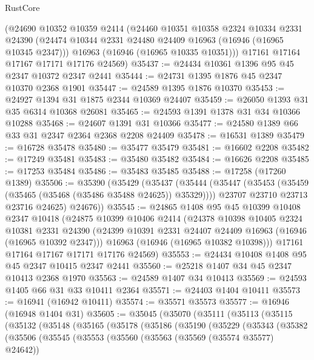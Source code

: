 \begin{lexlean}{RustCore}
\begin{coremodule}
    (@24690
      @10352
      @10359
      @2414
      (@24460
        @10351
        @10358
        @2324
        @10334
        @2331
        @24390
        (@24474 @10344 @2331 @24480 @24409 @16963 (@16946 (@16965 @10345 @2347)))
        @16963
        (@16946 (@16965 @10335 @10351)))
      @17161
      @17164
      @17167
      @17171
      @17176
      @24569)
@35437 := @24434 @10361 @1396 @95 @45 @2347 @10372 @2347 @2441
@35444 := @24731 @1395 @1876 @45 @2347 @10370 @2368 @1901
@35447 := @24589 @1395 @1876 @10370
@35453 := @24927 @1394 @31 @1875 @2344 @10369 @24407
@35459 := @26050 @1393 @31 @35 @6314 @10368 @26081
@35465 := @24593 @1391 @1378 @31 @34 @10366 @10288
@35468 := @24607 @1391 @31 @10366
@35477 := @24580 @1389 @66 @33 @31 @2347 @2364 @2368 @2208 @24409
@35478 := @16531 @1389
@35479 := @16728 @35478
@35480 := @35477 @35479
@35481 := @16602 @2208
@35482 := @17249 @35481
@35483 := @35480 @35482
@35484 := @16626 @2208
@35485 := @17253 @35484
@35486 := @35483 @35485
@35488 := @17258 (@17260 @1389)
@35506 := @35390
    (@35429
      (@35437
        (@35444
          (@35447 (@35453 (@35459 (@35465 (@35468 (@35486 @35488 @24625)) @35329))))
          @23707
          @23710
          @23713
          @23716
          @24625)
        @24676))
@35545 := @24865
    @1408
    @95
    @45
    @10399
    @10408
    @2347
    @10418
    (@24875
      @10399
      @10406
      @2414
      (@24378
        @10398
        @10405
        @2324
        @10381
        @2331
        @24390
        (@24399 @10391 @2331 @24407 @24409 @16963 (@16946 (@16965 @10392 @2347)))
        @16963
        (@16946 (@16965 @10382 @10398)))
      @17161
      @17164
      @17167
      @17171
      @17176
      @24569)
@35553 := @24434 @10408 @1408 @95 @45 @2347 @10415 @2347 @2441
@35560 := @25218 @1407 @34 @45 @2347 @10413 @2368 @1970
@35563 := @24589 @1407 @34 @10413
@35569 := @24593 @1405 @66 @31 @33 @10411 @2364
@35571 := @24403 @1404 @10411
@35573 := @16941 (@16942 @10411)
@35574 := @35571 @35573
@35577 := @16946 (@16948 @1404 @31)
@35605 := @35045
    (@35070
      (@35111
        (@35113
          (@35115
            (@35132
              (@35148
                (@35165
                  (@35178
                    (@35186
                      (@35190
                        (@35229
                          (@35343
                            (@35382
                              (@35506
                                (@35545
                                  (@35553
                                    (@35560
                                      (@35563 (@35569 (@35574 @35577) @24642))

\end{coremodule}
\end{lexlean}
